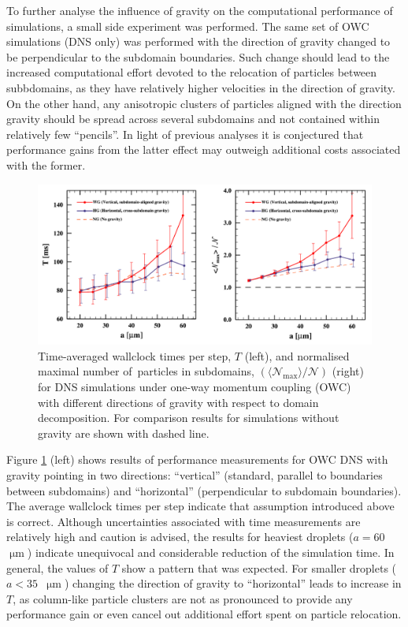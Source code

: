 \documentclass{pracamgren}
\begin{document}
\medskip

To further analyse the influence of gravity on the computational performance of simulations, a small side experiment was performed.
The same set of OWC simulations (DNS only) was performed with the direction of gravity changed to be perpendicular to the subdomain boundaries.
Such change should lead to the increased computational effort devoted to the relocation of particles between subbdomains, as they have relatively higher velocities in the direction of gravity.
On the other hand, any anisotropic clusters of particles aligned with the direction gravity should be spread across several subdomains and not contained within relatively few ``pencils''.
In light of previous analyses it is conjectured that performance gains from the latter effect may outweigh additional costs associated with the former.

\begin{figure}[h]
\centering
\includegraphics[width=13.5cm]{img/plots/3-4d-howcperf.pdf}
\caption{
Time-averaged wallclock times per step, $T$ (left), and normalised maximal number of~particles in subdomains, $(\langle \mathcal{N}_{\max} \rangle / \mathcal{N})$ (right) for DNS simulations under one-way momentum coupling (OWC) with different directions of gravity with respect to domain decomposition.
For comparison results for simulations without gravity are shown with dashed line. 
}
\label{fig:howcperf}
\end{figure}

Figure \ref{fig:howcperf} (left) shows results of performance measurements for OWC DNS with gravity pointing in two directions: ``vertical'' (standard, parallel to boundaries between subdomains) and ``horizontal'' (perpendicular to subdomain boundaries).
The average wallclock times per step indicate that assumption introduced above is correct.
Although uncertainties associated with time measurements are relatively high and caution is advised, the results for heaviest droplets ($a = 60$~$\upmu\text{m}$) indicate unequivocal and considerable reduction of the simulation time.
In general, the values of $T$ show a pattern that was expected.
For smaller droplets ($a < 35$~$\upmu\text{m}$) changing the direction of gravity to ``horizontal'' leads to increase in $T$, as column-like particle clusters are not as pronounced to provide any performance gain or even cancel out additional effort spent on particle relocation.   
\end{document}
